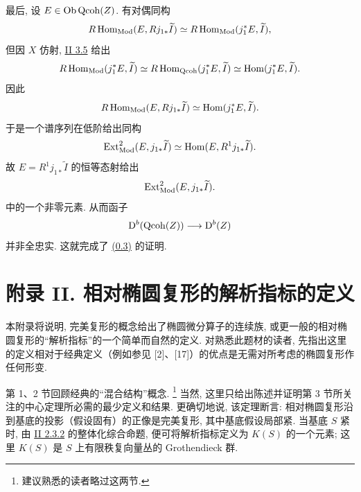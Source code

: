 最后, 设 $E\in\Ob\Qcoh(Z)$. 有对偶同构
\[
 R\Hom_{\Mod}(E,Rj_{1*}\widetilde I)
 \simeq R\Hom_{\Mod}(j_1^*E,\widetilde I),
\]
但因 $X$ 仿射, \hyperlink{sga6.e02.prop.3-5}{II 3.5} 给出
\[
 R\Hom_{\Mod}(j_1^*E,\widetilde I)
  \simeq R\Hom_{\Qcoh}(j_1^*E,\widetilde I)
  \simeq \Hom(j_1^*E,\widetilde I).
\]
因此
\[
 R\Hom_{\Mod}(E,Rj_{1*}\widetilde I)
 \simeq \Hom(j_1^*E,\widetilde I).
\]
于是一个谱序列在低阶给出同构
\[
 \Ext^2_{\Mod}(E,j_{1*}\widetilde I)
 \simeq \Hom(E,R^1j_{1*}\widetilde I).
\]
故 $E=R^1j_{1*}\widetilde I$ 的恒等态射给出
\[
 \Ext^2_{\Mod}(E,j_{1*}\widetilde I).
\]
中的一个非零元素. 从而函子
\[
 \mathrm D^b(\operatorname{Qcoh}(Z))\longrightarrow \mathrm D^b(Z)
\]
并非全忠实. 这就完成了 \hyperlink{sga6.e02.para.0-3}{(0.3)} 的证明.




\providecommand{\Diff}{\operatorname{Diff}}
\providecommand{\Hom}{\operatorname{Hom}}
\providecommand{\im}{\operatorname{Im}}
\providecommand{\ind}{\operatorname{ind}}
\providecommand{\Cone}{\operatorname{Cone}}
\providecommand{\Loclib}{\operatorname{Loclib}}
\providecommand{\ob}{\operatorname{ob}}
\providecommand{\Parf}{\operatorname{Parf}}
\providecommand{\Mod}{\operatorname{Mod}}
\providecommand{\Ob}{\operatorname{Ob}}
\providecommand{\Coker}{\operatorname{Coker}}
\providecommand{\Ker}{\operatorname{Ker}}
\providecommand{\cH}{\mathcal H}
\providecommand{\cO}{\mathcal O}
\providecommand{\cP}{\mathcal P}
\providecommand{\cE}{\mathcal E}
\providecommand{\cF}{\mathcal F}
\providecommand{\cG}{\mathcal G}
\providecommand{\cD}{\mathcal D}
\providecommand{\cT}{\mathcal T}
\providecommand{\cL}{\mathcal L}
\providecommand{\RHom}{\mathrm R\!\operatorname{Hom}}
\providecommand{\RGamma}{\mathrm R\Gamma}
\providecommand{\dlim}{\operatorname*{lim}}
\providecommand{\plim}{\operatorname*{lim}}


\newpage
{}\section*{附录 II. 相对椭圆复形的解析指标的定义}

本附录将说明, 完美复形的概念给出了椭圆微分算子的连续族, 或更一般的相对椭圆复形的“解析指标”的一个简单而自然的定义. 对熟悉此题材的读者, 先指出这里的定义相对于经典定义（例如参见 [2]、[17]）的优点是无需对所考虑的椭圆复形作任何形变.

第 1、2 节回顾经典的“混合结构”概念.
\footnote{建议熟悉的读者略过这两节.}
当然, 这里只给出陈述并证明第 3 节所关注的中心定理所必需的最少定义和结果. 更确切地说, 该定理断言: 相对椭圆复形沿到基底的投影（假设固有）的正像是完美复形, 其中基底假设局部紧. 当基底 $S$ 紧时, 由 \hyperlink{sga6.e02.prop.2-3-2}{II 2.3.2} 的整体化综合命题, 便可将解析指标定义为 $K(S)$ 的一个元素; 这里 $K(S)$ 是 $S$ 上有限秩复向量丛的 Grothendieck 群.

